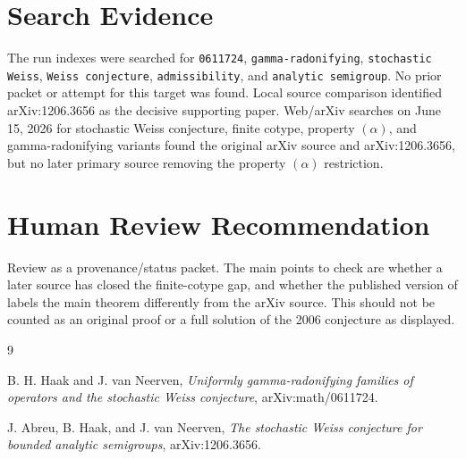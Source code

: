 \documentclass[11pt]{article}
\begin{document}
\section*{Search Evidence}

The run indexes were searched for \texttt{0611724}, \texttt{gamma-radonifying},
\texttt{stochastic Weiss}, \texttt{Weiss conjecture}, \texttt{admissibility},
and \texttt{analytic semigroup}. No prior packet or attempt for this target
was found. Local source comparison identified arXiv:1206.3656 as the decisive
supporting paper. Web/arXiv searches on June 15, 2026 for stochastic Weiss
conjecture, finite cotype, property $(\alpha)$, and gamma-radonifying variants
found the original arXiv source and arXiv:1206.3656, but no later primary
source removing the property $(\alpha)$ restriction.

\section*{Human Review Recommendation}

Review as a provenance/status packet. The main points to check are whether a
later source has closed the finite-cotype gap, and whether the published
version of \cite{AbreuHaakNeerven2012} labels the main theorem differently
from the arXiv source. This should not be counted as an original proof or a
full solution of the 2006 conjecture as displayed.

\begin{thebibliography}{9}

B. H. Haak and J. van Neerven,
\emph{Uniformly gamma-radonifying families of operators and the stochastic
Weiss conjecture},
arXiv:math/0611724.

J. Abreu, B. Haak, and J. van Neerven,
\emph{The stochastic Weiss conjecture for bounded analytic semigroups},
arXiv:1206.3656.

\end{thebibliography}
\end{document}
